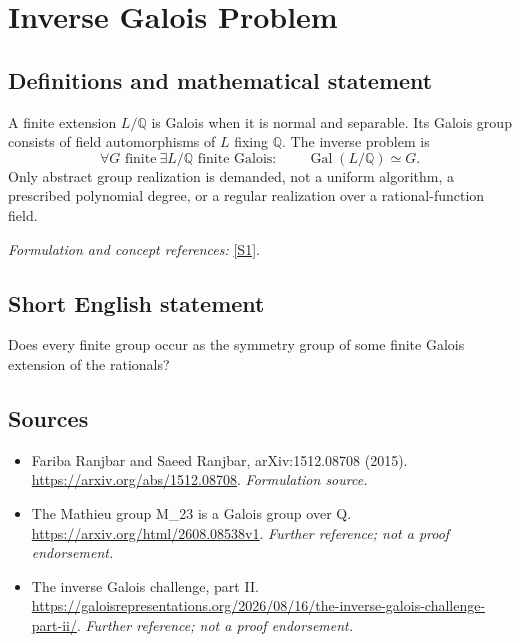 \documentclass[11pt]{article}
\begin{document}
\section*{\texorpdfstring{Inverse Galois Problem}{Inverse Galois Problem}}\label{statement}
\subsection{Definitions and mathematical statement}
A finite extension $L/{\mathbb{Q}}$ is Galois when it is normal and separable. Its Galois group consists of field automorphisms of $L$ fixing ${\mathbb{Q}}$. The inverse problem is
\[
 \forall G\text{ finite}\ \exists L/{\mathbb{Q}}\text{ finite Galois}:\qquad
 \operatorname{Gal}(L/{\mathbb{Q}})\simeq G.
\]
Only abstract group realization is demanded, not a uniform algorithm, a prescribed polynomial degree, or a regular realization over a rational-function field.
\par\smallskip\textit{Formulation and concept references:} \href{https://arxiv.org/abs/1512.08708}{[S1]}.

\subsection{Short English statement}
Does every finite group occur as the symmetry group of some finite Galois extension of the rationals?
\subsection{Sources}
\begin{itemize}
\item[S1]Fariba Ranjbar and Saeed Ranjbar, arXiv:1512.08708 (2015).
\url{https://arxiv.org/abs/1512.08708}.
\textit{Formulation source.}
\item[S2]The Mathieu group M\_23 is a Galois group over Q.
\url{https://arxiv.org/html/2608.08538v1}.
\textit{Further reference; not a proof endorsement.}
\item[S3]The inverse Galois challenge, part II.
\url{https://galoisrepresentations.org/2026/08/16/the-inverse-galois-challenge-part-ii/}.
\textit{Further reference; not a proof endorsement.}
\end{itemize}
\end{document}
